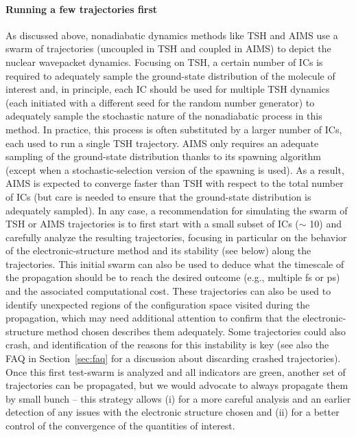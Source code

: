 \documentclass[9pt,bestpractices,pubversion]{livecoms}
\begin{document}
\paragraph{Running a few trajectories first}
As discussed above, nonadiabatic dynamics methods like TSH and AIMS use a swarm of trajectories (uncoupled in TSH and coupled in AIMS) to depict the nuclear wavepacket dynamics. Focusing on TSH, a certain number of ICs is required to adequately sample the ground-state distribution of the molecule of interest and, in principle, each IC should be used for multiple TSH dynamics (each initiated with a different seed for the random number generator) to adequately sample the stochastic nature of the nonadiabatic process in this method.\cite{Granucci2007,ibele2020} In practice, this process is often substituted by a larger number of ICs, each used to run a single TSH trajectory. AIMS only requires an adequate sampling of the ground-state distribution thanks to its spawning algorithm (except when a stochastic-selection version of the spawning is used). As a result, AIMS is expected to converge faster than TSH with respect to the total number of ICs\cite{Toniolo2005,Mukherjeelongtime2025} (but care is needed to ensure that the ground-state distribution is adequately sampled\cite{10.1063/5.0248950}). In any case, a recommendation for simulating the swarm of TSH or AIMS trajectories is to first start with a small subset of ICs ($\sim$ 10) and carefully analyze the resulting trajectories, focusing in particular on the behavior of the electronic-structure method and its stability (see below) along the trajectories. This initial swarm can also be used to deduce what the timescale of the propagation should be to reach the desired outcome (e.g., multiple fs or ps) and the associated computational cost. These trajectories can also be used to identify unexpected regions of the configuration space visited during the propagation, which may need additional attention to confirm that the electronic-structure method chosen describes them adequately. Some trajectories could also crash, and identification of the reasons for this instability is key (see also the FAQ in Section~\ref{sec:faq} for a discussion about discarding crashed trajectories). Once this first test-swarm is analyzed and all indicators are green, another set of trajectories can be propagated, but we would advocate to always propagate them by small bunch -- this strategy allows (i) for a more careful analysis and an earlier detection of any issues with the electronic structure chosen and (ii) for a better control of the convergence of the quantities of interest.
\end{document}
